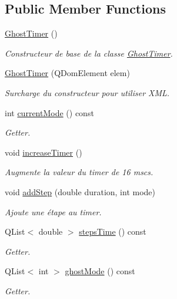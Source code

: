 \subsection*{Public Member Functions}
\begin{DoxyCompactItemize}
\item 
\hyperlink{class_ghost_timer_adebf7cf8bb544e23f6fd8ce7095b8394}{Ghost\+Timer} ()
\begin{DoxyCompactList}\small\item\em Constructeur de base de la classe \hyperlink{class_ghost_timer}{Ghost\+Timer}. \end{DoxyCompactList}\item 
\hyperlink{class_ghost_timer_a363147268fa53ea5e7f9e4b50b8453ef}{Ghost\+Timer} (Q\+Dom\+Element elem)
\begin{DoxyCompactList}\small\item\em Surcharge du constructeur pour utiliser X\+M\+L. \end{DoxyCompactList}\item 
int \hyperlink{class_ghost_timer_adf6ae0f333a95d4fe3e6f8a132a8201d}{current\+Mode} () const 
\begin{DoxyCompactList}\small\item\em Getter. \end{DoxyCompactList}\item 
void \hyperlink{class_ghost_timer_acca62ab4734e961d46965a7d10a886ad}{increase\+Timer} ()
\begin{DoxyCompactList}\small\item\em Augmente la valeur du timer de 16 mscs. \end{DoxyCompactList}\item 
void \hyperlink{class_ghost_timer_a5455ccb72e8404c464d41511e62c38d9}{add\+Step} (double duration, int mode)
\begin{DoxyCompactList}\small\item\em Ajoute une étape au timer. \end{DoxyCompactList}\item 
Q\+List$<$ double $>$ \hyperlink{class_ghost_timer_a39ac041b62126d669736383d299f4afe}{steps\+Time} () const 
\begin{DoxyCompactList}\small\item\em Getter. \end{DoxyCompactList}\item 
Q\+List$<$ int $>$ \hyperlink{class_ghost_timer_a18606ac671580c3e30f741c2d2cd0f83}{ghost\+Mode} () const 
\begin{DoxyCompactList}\small\item\em Getter. \end{DoxyCompactList}\end{DoxyCompactItemize}


